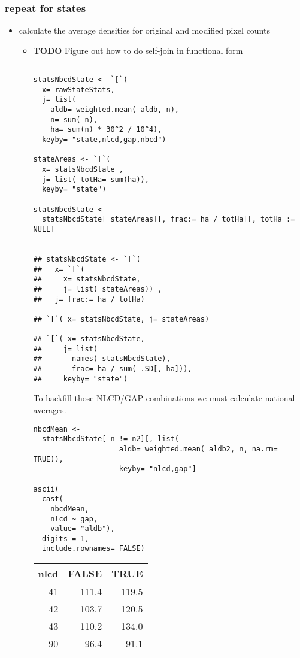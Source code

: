\documentclass[11pt]{article}
\begin{document}
\subsubsection{repeat for states}
\label{sec-3-5-4}
\begin{itemize}

\item calculate the average densities for original and modified pixel counts
\label{sec-3-5-4-1}%

\begin{itemize}

\item \textbf{TODO} Figure out how to do self-join in functional form\\
\label{sec-3-5-4-1-1}%
\begin{verbatim}

statsNbcdState <- `[`(
  x= rawStateStats,
  j= list(
    aldb= weighted.mean( aldb, n),
    n= sum( n),
    ha= sum(n) * 30^2 / 10^4),
  keyby= "state,nlcd,gap,nbcd")

stateAreas <- `[`(
  x= statsNbcdState ,
  j= list( totHa= sum(ha)),
  keyby= "state")

statsNbcdState <-
  statsNbcdState[ stateAreas][, frac:= ha / totHa][, totHa := NULL]


## statsNbcdState <- `[`(
##   x= `[`(
##     x= statsNbcdState,
##     j= list( stateAreas)) ,
##   j= frac:= ha / totHa)

## `[`( x= statsNbcdState, j= stateAreas)

## `[`( x= statsNbcdState,
##     j= list(
##       names( statsNbcdState),
##       frac= ha / sum( .SD[, ha])),
##     keyby= "state")
\end{verbatim}


To backfill those NLCD/GAP combinations we must calculate national averages.


\begin{verbatim}
nbcdMean <-
  statsNbcdState[ n != n2][, list(
                    aldb= weighted.mean( aldb2, n, na.rm= TRUE)),
                    keyby= "nlcd,gap"]

ascii(
  cast(
    nbcdMean,
    nlcd ~ gap,
    value= "aldb"),
  digits = 1,
  include.rownames= FALSE)
\end{verbatim}


\begin{center}
\begin{tabular}{rrr}
 nlcd  &  FALSE  &   TRUE  \\
\hline
   41  &  111.4  &  119.5  \\
   42  &  103.7  &  120.5  \\
   43  &  110.2  &  134.0  \\
   90  &   96.4  &   91.1  \\
\end{tabular}
\end{center}









\end{itemize}
\end{itemize}
\end{document}
